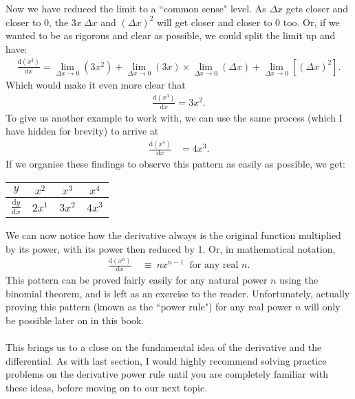 \documentclass[11pt]{article}
\numberwithin{equation}{section}
\begin{document}
Now we have reduced the limit to a ``common sense" level. As \(\Delta x\) gets closer and closer to 0, the \(3x \ \Delta x\) and \((\Delta x)^2\) will get closer and closer to 0 too. Or, if we wanted to be as rigorous and clear as possible, we could split the limit up and have:
\begin{align*}
\frac{\textrm{d}(x^3)}{\textrm{d}x} = \lim_{\Delta x \to 0} (3x^2) + \lim_{\Delta x \to 0} (3x) \times \lim_{\Delta x \to 0} (\Delta x) + \lim_{\Delta x \to 0} \left[(\Delta x)^2\right].
\end{align*}
Which would make it even more clear that
\begin{align*}
\frac{\textrm{d}(x^3)}{\textrm{d}x} = 3x^2.
\end{align*}
To give us another example to work with, we can use the same process (which I have hidden for brevity) to arrive at
\begin{align*}
\frac{\textrm{d}(x^4)}{\textrm{d}x} &= 4x^3.
\end{align*}
If we organise these findings to observe this pattern as easily as possible, we get:
\begin{center}
\begin{tabular}{||c|c|c|c||}
\hline
\(y\) & \(x^2\) & \(x^3\) & \(x^4\) \\
\hline
\(\frac{\textrm{d}y}{\textrm{d}x}\) & \(2x^1\) & \(3x^2\) & \(4x^3\) \\ 
\hline
\end{tabular}
\end{center}
We can now notice how the derivative always is the original function multiplied by its power, with its power then reduced by 1. Or, in mathematical notation,
\begin{align*}
\frac{\textrm{d}(x^n)}{\textrm{d}x} & \ \equiv \ nx^{n-1} \ \textrm{ for any real } n.
\end{align*}
This pattern can be proved fairly easily for any natural power \(n\) using the binomial theorem, and is left as an exercise to the reader. Unfortunately, actually proving this pattern (known as the ``power rule") for any real power \(n\) will only be possible later on in this book.
\\ \\ This brings us to a close on the fundamental idea of the derivative and the differential. As with last section, I would highly recommend solving practice problems on the derivative power rule until you are completely familiar with these ideas, before moving on to our next topic.
\end{document}
